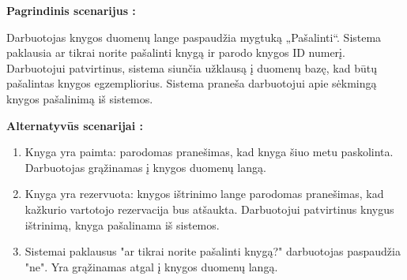 \documentclass{VUMIFPSkursinis}
\begin{document}

    
    \textbf {Pagrindinis scenarijus :}
    
    Darbuotojas knygos duomenų lange paspaudžia mygtuką „Pašalinti“. Sistema paklausia ar tikrai norite pašalinti knygą ir parodo knygos ID numerį. Darbuotojui patvirtinus, sistema siunčia užklausą į duomenų bazę, kad būtų pašalintas knygos egzempliorius. Sistema praneša darbuotojui apie sėkmingą knygos pašalinimą iš sistemos.

    \textbf {Alternatyvūs scenarijai :}
    	\begin{enumerate}
	\item Knyga yra paimta: parodomas pranešimas, kad knyga šiuo metu paskolinta. Darbuotojas grąžinamas į knygos duomenų langą.

	\item Knyga yra rezervuota: knygos ištrinimo lange parodomas pranešimas, kad kažkurio vartotojo rezervacija bus atšaukta. Darbuotojui patvirtinus knygus ištrinimą, knyga pašalinama iš sistemos.

 	\item Sistemai paklausus "ar tikrai norite pašalinti knygą?" darbuotojas paspaudžia "ne". Yra grąžinamas atgal į knygos duomenų langą.
\end{enumerate}
\end{document}
